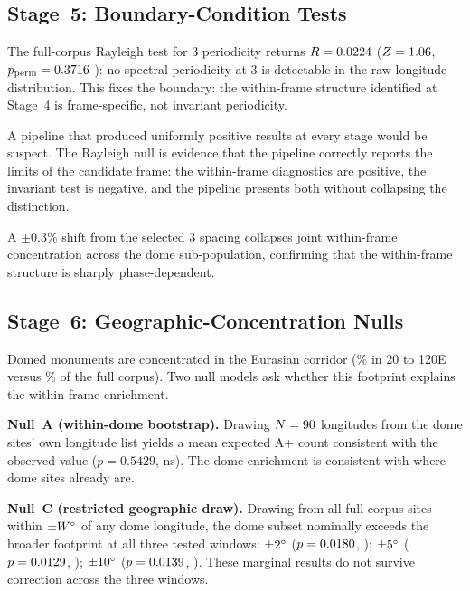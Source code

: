 \documentclass[12pt,a4paper]{article}
\newcommand{\degr}{\ifmmode{^\circ}\else\textdegree{}\fi}
\begin{document}
\subsection{Stage~5: Boundary-Condition Tests}
\label{sec:boundary}

The full-corpus Rayleigh test for 3\degr{} periodicity returns
$R = 0.0224$ ($Z = 1.06$,
$p_{\mathrm{perm}} = 0.3716$ \fullRayleighPermPSig{}): no
spectral periodicity at 3\degr{} is detectable in the raw longitude
distribution. This fixes the boundary: the within-frame structure
identified at Stage~4 is frame-specific, not invariant periodicity.

A pipeline that produced uniformly positive results at every stage would
be suspect. The Rayleigh null is evidence that the pipeline correctly
reports the limits of the candidate frame: the within-frame diagnostics
are positive, the invariant test is negative, and the pipeline presents
both without collapsing the distinction.

A $\pm 0.3\%$ shift from the selected 3\degr{} spacing collapses joint
within-frame concentration across the dome sub-population, confirming
that the within-frame structure is sharply phase-dependent.

\subsection{Stage~6: Geographic-Concentration Nulls}
\label{sec:geo_null}

Domed monuments are concentrated in the Eurasian corridor
(\domeEurasianFraction\% in 20\degr{} to 120\degr{}E versus
\fullCorpusEurasianFraction\% of the full corpus). Two null models ask
whether this footprint explains the within-frame enrichment.

\textbf{Null~A (within-dome bootstrap).} Drawing $N = 90$
longitudes from the dome sites' own longitude list yields a mean
expected A+ count consistent with the observed value
($p = 0.5429$, ns). The dome enrichment is consistent with where dome
sites already are.

\textbf{Null~C (restricted geographic draw).} Drawing from all
full-corpus sites within $\pm W\degr{}$ of any dome longitude, the
dome subset nominally exceeds the broader footprint at all three tested
windows: $\pm 2\degr{}$ ($p = 0.0180$,
\geoNullDomeRestrictedPtwoSig{}); $\pm 5\degr{}$
($p = 0.0129$, \geoNullDomeRestrictedPSig{});
$\pm 10\degr{}$ ($p = 0.0139$,
\geoNullDomeRestrictedPtenSig{}). These marginal results do not
survive correction across the three windows.
\end{document}
